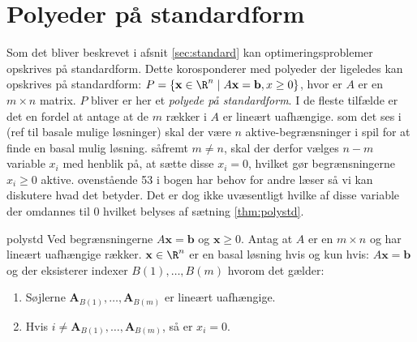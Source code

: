 \section{Polyeder på standardform}
\label{afsnit:fisk}
%
Som det bliver beskrevet i afsnit \ref{sec:standard} kan optimeringsproblemer opskrives på standardform.
Dette korosponderer med polyeder der ligeledes kan opskrives på standardform: 
$P=\{ \mathbf{x} \in \R^n \mid A\mathbf{x}=\mathbf{b},x \geq 0 \}$, hvor er $A$ er en $m \times n$ matrix.
$P$ bliver er her et \textit{polyede på standardform}.
I de fleste tilfælde er det en fordel at antage at de $m$ rækker i $A$ er lineært uafhængige.
som det ses i (ref til basale mulige løsninger) skal der være $n$ aktive-begrænsninger i spil for at finde en basal mulig løsning.
såfremt $m \neq n$, skal der derfor vælges $n-m$ variable $x_i$ med henblik på, at sætte disse $x_i=0$, hvilket gør begrænsningerne $x_i \geq 0$ aktive.
ovenstående 53 i bogen har behov for andre læser så vi kan diskutere hvad det betyder.
Det er dog ikke uvæsentligt hvilke af disse variable der omdannes til $0$ hvilket belyses af sætning \ref{thm:polystd}.
\begin{thm}{}{polystd}
Ved begrænsningerne $A\mathbf{x}=\mathbf{b}$ og $\mathbf{x}\geq 0$.
Antag at $A$ er en $m \times n$ og har lineært uafhængige rækker.
$\mathbf{x} \in \R^n$ er en basal løsning hvis og kun hvis: $A\mathbf{x}=\mathbf{b}$ og der eksisterer indexer $B(1),\ldots,B(m)$ hvorom det gælder:
\begin{enumerate}[label=(\alph*)]
\item Søjlerne $\mathbf{A}_{B(1)},\ldots,\mathbf{A}_{B(m)}$ er lineært uafhængige.
\item Hvis $i \neq \mathbf{A}_{B(1)},\ldots,\mathbf{A}_{B(m)}$, så er $x_i=0$.
\end{enumerate}
\end{thm}

